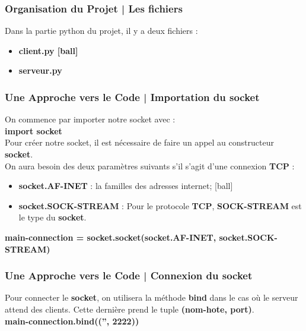 \documentclass[handout]{beamer}
\begin{document}
	\begin{frame} [label=O]
	\frametitle{Organisation du Projet | Les fichiers}
	Dans la partie python du projet, il y a deux fichiers :
	\begin{itemize}
		\item \bfseries{client.py}
		\item \bfseries{serveur.py}
	\end{itemize}
	\end{frame}
	
	\begin{frame} [label=A]
	\frametitle{Une Approche vers le Code | Importation du socket}
	On commence par importer notre socket avec :\newline \\
	{\bfseries import socket}\newline \\
	Pour créer notre socket, il est nécessaire de faire un appel au constructeur 				{\bfseries socket}.\newline \\
	On aura besoin des deux paramètres suivants s'il s'agit d'une connexion {\bfseries 			TCP} :
	\begin{itemize}
		\item {\bfseries socket.AF-INET} : la familles des adresses internet;
		\item {\bfseries socket.SOCK-STREAM} : Pour le protocole {\bfseries TCP}, 					{\bfseries SOCK-STREAM} est le type du {\bfseries socket}.\newline
	\end{itemize}
 	{\bfseries main-connection = socket.socket(socket.AF-INET, socket.SOCK-STREAM)}
	\end{frame}

	\begin{frame}
	\frametitle{Une Approche vers le Code | Connexion du socket}
	Pour connecter le {\bfseries socket}, on utilisera la méthode {\bfseries bind} dans le 	cas où le serveur attend des clients.
	Cette dernière prend le tuple {\bfseries (nom-hote, port)}.\newline \\
	{\bfseries main-connection.bind(('', 2222))}
	\end{frame}
	
\end{document}
